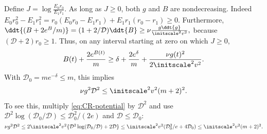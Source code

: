 Define
 $J=\log\frac{E_0r_0}{E_1r_1}.$ 
As long as $J\ge0$, both $g$ and $B$ are nondecreasing. Indeed
 $E_0r_0^2-E_1r_1^2 =r_0(E_0r_0-E_1r_1)+E_1r_1(r_0-r_1)\ge0.$ 
Furthermore,
 $\ddt{(B+2e^B/m)}=(1+2/\mathcal D)\ddt{B}\ge\nu\frac{g\ddt{g}}{\initscale^2v^2},$ 
because $(\mathcal D+2)r_0\ge1$. Thus, on any interval starting at zero on which $J\ge0$,
\begin{equation}
 B(t)+\frac{2e^{B(t)}}m\ge\delta+\frac{2e^\delta}m+\frac{\nu g(t)^2}{2\initscale^2v^2}.
 \label{eq:CR-potential}
\end{equation}
With $\mathcal D_0=me^{-\delta}\le m$, this implies
\begin{equation}
 \nu g^2\mathcal D^2\le\initscale^2v^2(m+2)^2.
 \label{eq:CR-budget}
\end{equation}
To see this, multiply \eqref{eq:CR-potential} by $\mathcal D^2$ and use
$\mathcal D^2\log(\mathcal D_0/\mathcal D)\le \mathcal D_0^2/(2e)$ and $\mathcal D\le \mathcal D_0$:
 $\nu g^2\mathcal D^2\le2\initscale^2v^2\{\mathcal D^2\log(\mathcal D_0/\mathcal D)+2\mathcal D\} \le\initscale^2v^2(\mathcal D_0^2/e+4\mathcal D_0)\le\initscale^2v^2(m+2)^2.$ 

